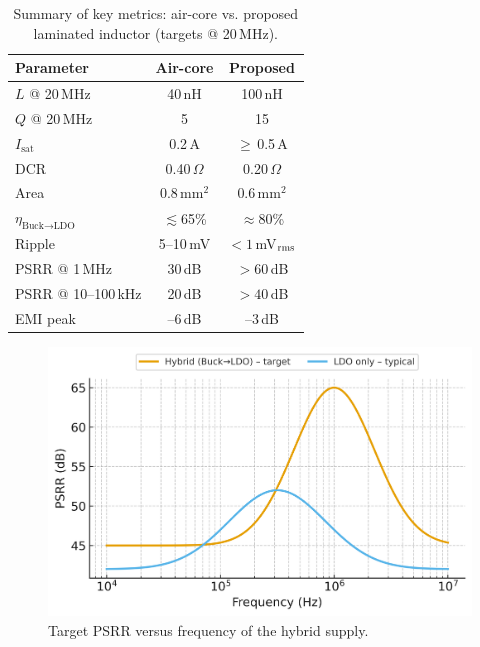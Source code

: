 \documentclass[journal]{IEEEtran}
\begin{document}
\begin{table}[t]
\centering
\caption{Summary of key metrics: air-core vs. proposed laminated inductor (targets @ 20\,MHz).}
\label{tab:summary}
\begin{tabular}{lcc}
\toprule
\textbf{Parameter} & \textbf{Air-core} & \textbf{Proposed}\\
\midrule
$L$ @ 20\,MHz & 40\,nH & 100\,nH\\
$Q$ @ 20\,MHz & 5 & 15\\
$I_{\text{sat}}$ & 0.2\,A & $\ge$\,0.5\,A\\
DCR & 0.40\,$\Omega$ & 0.20\,$\Omega$\\
Area & 0.8\,mm$^2$ & 0.6\,mm$^2$\\
$\eta_{\text{Buck}\rightarrow\text{LDO}}$ & $\lesssim$65\% & $\approx$80\%\\
Ripple & 5--10\,mV & $<1$\,mV$_{\rm rms}$\\
PSRR @ 1\,MHz & 30\,dB & $>60$\,dB\\
PSRR @ 10--100\,kHz & 20\,dB & $>40$\,dB\\
EMI peak & --6\,dB & --3\,dB\\
\bottomrule
\end{tabular}
\end{table}

\begin{figure}[t]
  \centering
  \includegraphics[width=\columnwidth]{fig4_psrr_target.png}
  \caption{Target PSRR versus frequency of the hybrid supply.}
  \label{fig:psrr}
\end{figure}
\end{document}
